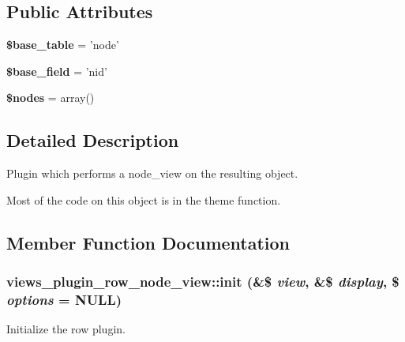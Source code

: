 \subsection*{Public Attributes}
\begin{DoxyCompactItemize}
\item 
\hypertarget{classviews__plugin__row__node__view_a24bbaae2ffd937d231ff9918a7c4067e}{
{\bfseries \$base\_\-table} = 'node'}
\label{classviews__plugin__row__node__view_a24bbaae2ffd937d231ff9918a7c4067e}

\item 
\hypertarget{classviews__plugin__row__node__view_ae77441cc82786f0acca947e12a38c922}{
{\bfseries \$base\_\-field} = 'nid'}
\label{classviews__plugin__row__node__view_ae77441cc82786f0acca947e12a38c922}

\item 
\hypertarget{classviews__plugin__row__node__view_ac15e21d5118e882d46bf0630618916b3}{
{\bfseries \$nodes} = array()}
\label{classviews__plugin__row__node__view_ac15e21d5118e882d46bf0630618916b3}

\end{DoxyCompactItemize}


\subsection{Detailed Description}
Plugin which performs a node\_\-view on the resulting object.

Most of the code on this object is in the theme function. 

\subsection{Member Function Documentation}
\hypertarget{classviews__plugin__row__node__view_a3bb6fb204cefdab520d24765a8f916ba}{
\subsubsection[{init}]{\setlength{\rightskip}{0pt plus 5cm}views\_\-plugin\_\-row\_\-node\_\-view::init (\&\$ {\em view}, \/  \&\$ {\em display}, \/  \$ {\em options} = {\ttfamily NULL})}}
\label{classviews__plugin__row__node__view_a3bb6fb204cefdab520d24765a8f916ba}
Initialize the row plugin. 

